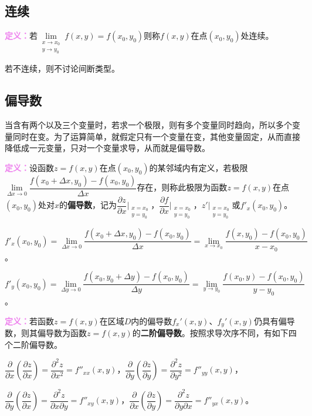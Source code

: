 \subsection{连续}

\textcolor{violet}{\textbf{定义：}}若$\lim\limits_{\substack{x\to x_0\\y\to y_0}}f(x,y)=f(x_0,y_0)$则称$f(x,y)$在点$(x_0,y_0)$处连续。

若不连续，则不讨论间断类型。

\subsection{偏导数}

当含有两个以及三个变量时，若求一个极限，则有多个变量同时趋向，所以多个变量同时在变。为了运算简单，就假定只有一个变量在变，其他变量固定，从而直接降低成一元变量，只对一个变量求导，从而就是偏导数。

\textcolor{violet}{\textbf{定义：}}设函数$z=f(x,y)$在点$(x_0,y_0)$的某邻域内有定义，若极限\\$\lim\limits_{\Delta x\to0}\dfrac{f(x_0+\Delta x,y_0)-f(x_0,y_0)}{\Delta x}$存在，则称此极限为函数$z=f(x,y)$在点$(x_0,y_0)$处对$x$的\textbf{偏导数}，记为$\dfrac{\partial z}{\partial x}\bigg|_{\substack{x=x_0\\y=y_0}}$，$\dfrac{\partial f}{\partial x}\bigg|_{\substack{x=x_0\\y=y_0}}$，$z'\bigg|_{\substack{x=x_0\\y=y_0}}$或$f'_x(x_0,y_0)$。\medskip

$f'_x(x_0,y_0)=\lim\limits_{\Delta x\to0}\dfrac{f(x_0+\Delta x,y_0)-f(x_0,y_0)}{\Delta x}=\lim\limits_{x\to x_0}\dfrac{f(x,y_0)-f(x_0,y_0)}{x-x_0}$。

$f'_y(x_0,y_0)=\lim\limits_{\Delta y\to0}\dfrac{f(x_0,y_0+\Delta y)-f(x_0,y_0)}{\Delta y}=\lim\limits_{y\to y_0}\dfrac{f(x_0,y)-f(x_0,y_0)}{y-y_0}$。

\textcolor{violet}{\textbf{定义：}}若函数$z=f(x,y)$在区域$D$内的偏导数$f_x'(x,y)$、$f_y'(x,y)$仍具有偏导数，则其偏导数为函数$z=f(x,y)$的\textbf{二阶偏导数}。按照求导次序不同，有如下四个二阶偏导数。

$\dfrac{\partial}{\partial x}\left(\dfrac{\partial z}{\partial x}\right)=\dfrac{\partial^2z}{\partial x^2}=f''_{xx}(x,y)$，$\dfrac{\partial}{\partial y}\left(\dfrac{\partial z}{\partial y}\right)=\dfrac{\partial^2z}{\partial y^2}=f''_{yy}(x,y)$，

$\dfrac{\partial}{\partial y}\left(\dfrac{\partial z}{\partial x}\right)=\dfrac{\partial^2z}{\partial x\partial y}=f''_{xy}(x,y)$，$\dfrac{\partial}{\partial x}\left(\dfrac{\partial z}{\partial y}\right)=\dfrac{\partial^2z}{\partial y\partial x}=f''_{yx}(x,y)$。

